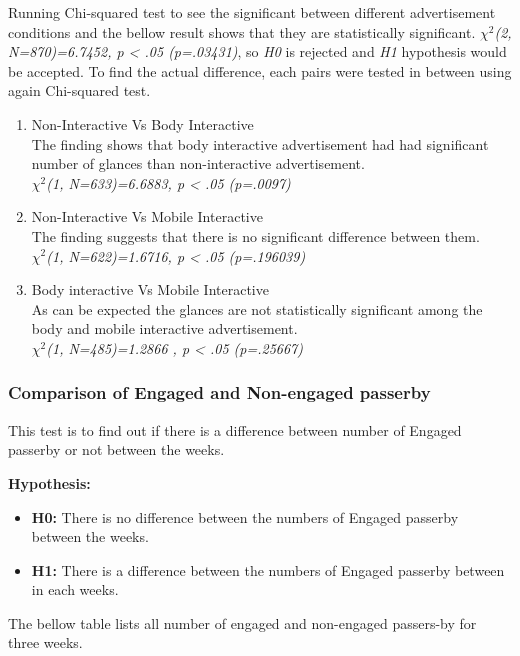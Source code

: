 Running Chi-squared test to see the significant between different advertisement conditions and the bellow result shows that they are statistically significant.
${\chi}^2$\emph{(2, N=870)=6.7452, p < .05 (p=.03431)}, so \emph{H0} is rejected and \emph{H1} hypothesis would be accepted.
To find the actual difference, each pairs were tested in between using again Chi-squared test.

\begin{enumerate}
\item Non-Interactive Vs Body Interactive \\
The finding shows that body interactive advertisement had had significant number of glances than non-interactive advertisement. \\
${\chi}^2$\emph{(1, N=633)=6.6883, p < .05 (p=.0097)}

\item Non-Interactive Vs Mobile Interactive  \\
The finding suggests that there is no significant difference between them.\\
${\chi}^2$\emph{(1, N=622)=1.6716, p < .05 (p=.196039)}

\item Body interactive Vs Mobile Interactive \\
As can be expected the glances are not statistically significant among the body and mobile interactive advertisement.\\
${\chi}^2$\emph{(1, N=485)=1.2866 , p < .05 (p=.25667)}

\end{enumerate}


\subsubsection {Comparison of Engaged and Non-engaged passerby}
This test is to find out if there is a difference between number of Engaged passerby or not between the weeks.

\textbf{Hypothesis: }
\begin{itemize}
\item \textbf{H0:} There is no difference between the numbers of Engaged passerby between the weeks.
\item \textbf{H1:} There is a difference between the numbers of Engaged passerby between in each weeks.
\end{itemize}

The bellow table lists all number of engaged and non-engaged passers-by for three weeks.


